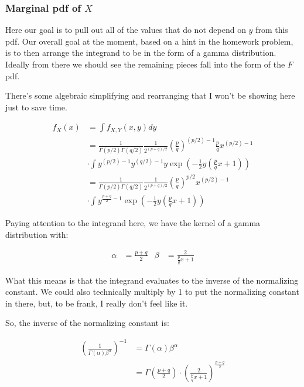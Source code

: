 \subsubsection*{Marginal pdf of $X$}

Here our goal is to pull out all of the values that do not depend on $y$ from this pdf. Our overall goal at the moment, based on a hint in the homework problem, is to then arrange the integrand to be in the form of a gamma distribution. Ideally from there we should see the remaining pieces fall into the form of the $F$ pdf.

There's some algebraic simplifying and rearranging that I won't be showing here just to save time. 

\begin{align*}
	f_X(x) &= \int f_{X,Y}(x,y) dy \\
	&= \frac{1}{\Gamma(p/2)\Gamma(q/2)} 
	\frac{1}{2^{(p+q)/2}} 
	\left( \frac{p}{q} \right)^{(p/2)-1} 
	\frac{p}{q}
	x^{(p/2)-1} \\
	&\cdot \int y^{(p/2)-1} y^{(q/2)-1} y \exp\left( -\frac{1}{2}y \left( \frac{p}{q}x + 1 \right) \right) \\
	&= \frac{1}{\Gamma(p/2)\Gamma(q/2)} 
	\frac{1}{2^{(p+q)/2}} 
	\left( \frac{p}{q} \right)^{p/2} 
	x^{(p/2)-1} \\
	&\cdot \int y^{\frac{p+q}{2} - 1} \exp\left( -\frac{1}{2}y \left( \frac{p}{q}x + 1 \right) \right)
\end{align*}

Paying attention to the integrand here, we have the kernel of a gamma distribution with:\vspace{-2mm}

\begin{align*}
	\alpha &= \frac{p+q}{2} & \beta &= \frac{2}{\frac{p}{q}x + 1}
\end{align*}

What this means is that the integrand evaluates to the inverse of the normalizing constant. We could also technically multiply by 1 to put the normalizing constant in there, but, to be frank, I really don't feel like it.

So, the inverse of the normalizing constant is:

\begin{align*}
	\left( \frac{1}{\Gamma(\alpha)\beta^{\alpha}} \right)^{-1} &= \Gamma(\alpha)\beta^{\alpha} \\
	&= \Gamma\left( \frac{p+q}{2} \right) \cdot \left( \frac{2}{\frac{p}{q}x + 1} \right)^{\frac{p+q}{2}}
\end{align*}

